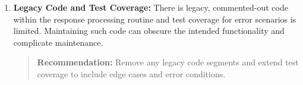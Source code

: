 \documentclass[12pt,a4paper]{article}
\begin{document}
\begin{enumerate}



    \item \textbf{Legacy Code and Test Coverage:}
    There is legacy, commented-out code within the response processing routine and test coverage for error scenarios is limited. Maintaining such code can obscure the intended functionality and complicate maintenance.
    \begin{quote}
    \textbf{Recommendation:} Remove any legacy code segments and extend test coverage to include edge cases and error conditions.
    \end{quote}
\end{enumerate}
\end{document}
